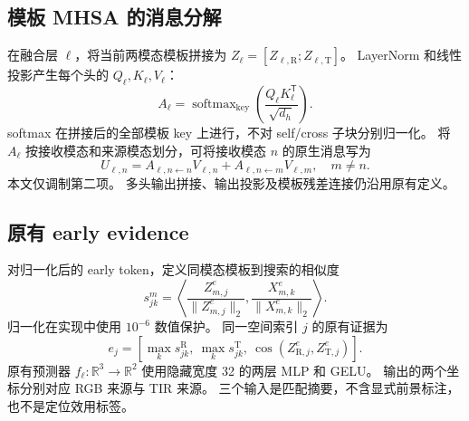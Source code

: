 \documentclass[journal]{IEEEtran}
\newcommand{\R}{\mathrm{R}}
\newcommand{\T}{\mathrm{T}}
\newcommand{\softmax}{\operatorname{softmax}}
\begin{document}
\subsection{模板 MHSA 的消息分解}
在融合层 $\ell$，将当前两模态模板拼接为 $Z_\ell=[Z_{\ell,\R};Z_{\ell,\T}]$。
LayerNorm 和线性投影产生每个头的 $Q_\ell,K_\ell,V_\ell$：
\begin{equation}
 A_\ell=\softmax_{\mathrm{key}}\!\left(\frac{Q_\ell K_\ell^{\mathsf T}}{\sqrt{d_h}}\right).
 \label{eq:attention}
\end{equation}
softmax 在拼接后的全部模板 key 上进行，不对 self/cross 子块分别归一化。
将 $A_\ell$ 按接收模态和来源模态划分，可将接收模态 $n$ 的原生消息写为
\begin{equation}
 U_{\ell,n}=A_{\ell,n\leftarrow n}V_{\ell,n}
              +A_{\ell,n\leftarrow m}V_{\ell,m},\quad m\ne n.
\end{equation}
本文仅调制第二项。
多头输出拼接、输出投影及模板残差连接仍沿用原有定义。

\subsection{原有 early evidence}
对归一化后的 early token，定义同模态模板到搜索的相似度
\begin{equation}
 s_{jk}^{m}=\left\langle\frac{Z_{m,j}^{e}}{\|Z_{m,j}^{e}\|_2},
                              \frac{X_{m,k}^{e}}{\|X_{m,k}^{e}\|_2}\right\rangle.
\end{equation}
归一化在实现中使用 $10^{-6}$ 数值保护。
同一空间索引 $j$ 的原有证据为
\begin{equation}
 e_j=\left[\max_k s_{jk}^{\R},\ \max_k s_{jk}^{\T},\
             \cos(Z_{\R,j}^{e},Z_{\T,j}^{e})\right].
 \label{eq:evidence}
\end{equation}
原有预测器 $f_\ell:\mathbb{R}^3\to\mathbb{R}^2$ 使用隐藏宽度 32 的两层 MLP 和 GELU。
输出的两个坐标分别对应 RGB 来源与 TIR 来源。
三个输入是匹配摘要，不含显式前景标注，也不是定位效用标签。
\end{document}
